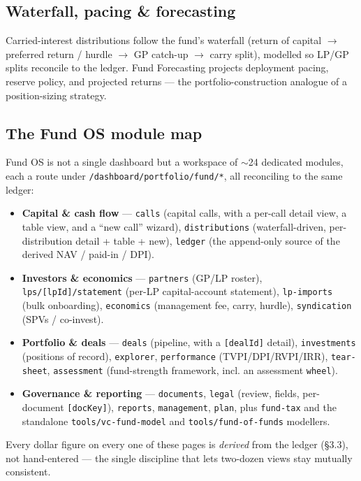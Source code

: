 \documentclass[11pt]{article}
\begin{document}
\subsection{Waterfall, pacing \& forecasting}
Carried-interest distributions follow the fund's waterfall (return of capital
$\to$ preferred return / hurdle $\to$ GP catch-up $\to$ carry split), modelled so
LP/GP splits reconcile to the ledger. Fund Forecasting projects deployment pacing,
reserve policy, and projected returns --- the portfolio-construction analogue of a
position-sizing strategy.

\subsection{The Fund OS module map}
Fund OS is not a single dashboard but a workspace of $\sim$24 dedicated modules,
each a route under \texttt{/dashboard/portfolio/fund/*}, all reconciling to the
same ledger:
\begin{itemize}[leftmargin=1.2em,itemsep=1pt]
\item \textbf{Capital \& cash flow} --- \texttt{calls} (capital calls, with a
per-call detail view, a table view, and a ``new call'' wizard),
\texttt{distributions} (waterfall-driven, per-distribution detail + table + new),
\texttt{ledger} (the append-only source of the derived NAV / paid-in / DPI).
\item \textbf{Investors \& economics} --- \texttt{partners} (GP/LP roster),
\texttt{lps/[lpId]/statement} (per-LP capital-account statement),
\texttt{lp-imports} (bulk onboarding), \texttt{economics} (management fee, carry,
hurdle), \texttt{syndication} (SPVs / co-invest).
\item \textbf{Portfolio \& deals} --- \texttt{deals} (pipeline, with a
\texttt{[dealId]} detail), \texttt{investments} (positions of record),
\texttt{explorer}, \texttt{performance} (TVPI/DPI/RVPI/IRR), \texttt{tear-sheet},
\texttt{assessment} (fund-strength framework, incl. an assessment \texttt{wheel}).
\item \textbf{Governance \& reporting} --- \texttt{documents},
\texttt{legal} (review, fields, per-document \texttt{[docKey]}), \texttt{reports},
\texttt{management}, \texttt{plan}, plus \texttt{fund-tax} and the standalone
\texttt{tools/vc-fund-model} and \texttt{tools/fund-of-funds} modellers.
\end{itemize}
Every dollar figure on every one of these pages is \emph{derived} from the ledger
(\S3.3), not hand-entered --- the single discipline that lets two-dozen views stay
mutually consistent.
\end{document}
